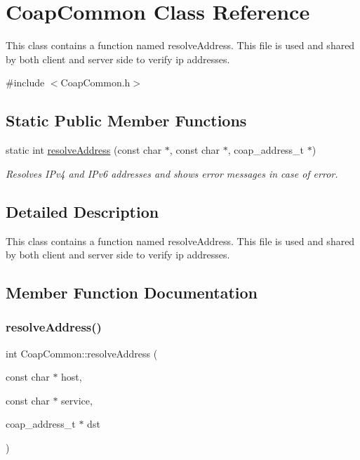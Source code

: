 \hypertarget{classCoapCommon}{}\section{Coap\+Common Class Reference}
\label{classCoapCommon}


This class contains a function named resolve\+Address. This file is used and shared by both client and server side to verify ip addresses.  




{\ttfamily \#include $<$Coap\+Common.\+h$>$}

\subsection*{Static Public Member Functions}
\begin{DoxyCompactItemize}
\item 
static int \hyperlink{classCoapCommon_a3a2b20fe477be1c328f3ad0bc98f28dd}{resolve\+Address} (const char $\ast$, const char $\ast$, coap\+\_\+address\+\_\+t $\ast$)
\begin{DoxyCompactList}\small\item\em Resolves I\+Pv4 and I\+Pv6 addresses and shows error messages in case of error. \end{DoxyCompactList}\end{DoxyCompactItemize}


\subsection{Detailed Description}
This class contains a function named resolve\+Address. This file is used and shared by both client and server side to verify ip addresses. 

\subsection{Member Function Documentation}
\mbox{\label{classCoapCommon_a3a2b20fe477be1c328f3ad0bc98f28dd}} 
\subsubsection{\texorpdfstring{resolve\+Address()}{resolveAddress()}}
{\footnotesize\ttfamily int Coap\+Common\+::resolve\+Address (\begin{DoxyParamCaption}\item[{const char $\ast$}]{host,  }\item[{const char $\ast$}]{service,  }\item[{coap\+\_\+address\+\_\+t $\ast$}]{dst }\end{DoxyParamCaption})\hspace{0.3cm}{\ttfamily [static]}}



